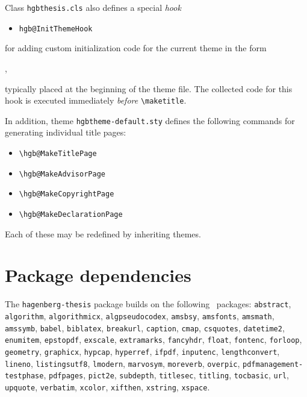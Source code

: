\documentclass[english]{hgbarticle}
\begin{document}
\noindent
Class \texttt{hgbthesis.cls} also defines a special \emph{hook}
\begin{itemize}
\item[] \verb!hgb@InitThemeHook!
\end{itemize}
for adding custom initialization code for the current theme in the form
%
\begin{LaTeXCode}[numbers=none]
,
\end{LaTeXCode}
%
typically placed at the beginning of the theme file. The collected code for
this hook is executed immediately \emph{before} \verb!\maketitle!.


In addition, theme \texttt{hgbtheme-default.sty} defines the following
commands for generating individual title pages:
%
\begin{itemize}
  \item[] \verb!\hgb@MakeTitlePage!
  \item[] \verb!\hgb@MakeAdvisorPage!
  \item[] \verb!\hgb@MakeCopyrightPage!
  \item[] \verb!\hgb@MakeDeclarationPage!
\end{itemize}
%
Each of these may be redefined by inheriting themes.

\section{Package dependencies}

\begin{sloppypar}
The \texttt{hagenberg-thesis} package builds on the following \latex\ packages:\newline
\texttt{abstract}, 
\texttt{algorithm}, 
\texttt{algorithmicx}, 
\texttt{algpseudocodex}, 
\texttt{amsbsy}, 
\texttt{amsfonts}, 
\texttt{amsmath}, 
\texttt{amssymb}, 
\texttt{babel}, 
\texttt{biblatex}, 
\texttt{breakurl}, 
\texttt{caption}, 
\texttt{cmap}, 
\texttt{csquotes}, 
\texttt{datetime2}, 
\texttt{enumitem}, 
\texttt{epstopdf}, 
\texttt{exscale},
\texttt{extramarks},
\texttt{fancyhdr}, 
\texttt{float}, 
\texttt{fontenc},
\texttt{forloop},
\texttt{geometry}, 
\texttt{graphicx}, 
\texttt{hypcap}, 
\texttt{hyperref}, 
\texttt{ifpdf}, 
\texttt{inputenc}, 
\texttt{lengthconvert},
\texttt{lineno},
\texttt{listingsutf8}, 
\texttt{lmodern},
\texttt{marvosym}, 
\texttt{moreverb}, 
\texttt{overpic}, 
\texttt{pdfmanagement-testphase}, 
\texttt{pdfpages}, 
\texttt{pict2e}, 
\texttt{subdepth}, 
\texttt{titlesec}, 
\texttt{titling},
\texttt{tocbasic},
\texttt{url}, 
\texttt{upquote}, 
\texttt{verbatim}, 
\texttt{xcolor}, 
\texttt{xifthen},
\texttt{xstring},
\texttt{xspace}.
\end{sloppypar}
\end{document}
